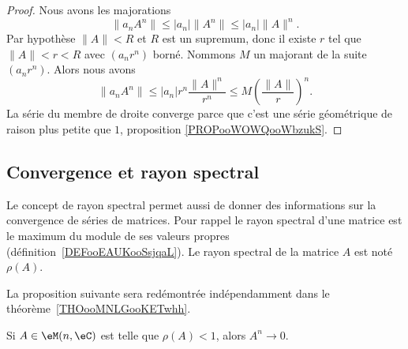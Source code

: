 \begin{proof}
	Nous avons les majorations
	\begin{equation}
		\| a_n A^n\|\leq | a_n |\| A^n \|\leq | a_n |\| A \|^n.
	\end{equation}
	Par hypothèse \( \| A \|<R\) et \( R\) est un supremum, donc il existe \( r\) tel que \( \| A \|<r<R\) avec \( (a_nr^n)\) borné. Nommons \( M\) un majorant de la suite \( (a_nr^n)\). Alors nous avons
	\begin{equation}
		\| a_nA^n \|\leq | a_n |r^n\frac{ \| A \|^n }{ r^n }\leq M\left( \frac{ \| A \| }{ r } \right)^n.
	\end{equation}
	La série du membre de droite converge parce que c'est une série géométrique de raison plus petite que \( 1\), proposition \ref{PROPooWOWQooWbzukS}.
\end{proof}

\subsection{Convergence et rayon spectral}

Le concept de rayon spectral permet aussi de donner des informations sur la convergence de séries de matrices. Pour rappel le rayon spectral d'une matrice est le maximum du module de ses valeurs propres (définition~\ref{DEFooEAUKooSsjqaL}). Le rayon spectral de la matrice \( A\) est noté \( \rho(A)\).

La proposition suivante sera redémontrée indépendamment dans le théorème~\ref{THOooMNLGooKETwhh}.

\begin{proposition}      \label{PROPooDJFLooBqqEPT}
	Si \( A\in \eM(n,\eC)\) est telle que \( \rho(A)<1\), alors \( A^n\to 0\).
\end{proposition}

